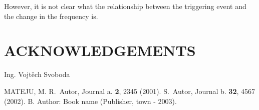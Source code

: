 \documentclass[twoside]{articlek}
\begin{document}
However, it is not clear what the relationship between the triggering event and the change in the frequency is. 
\section{ACKNOWLEDGEMENTS}

Ing. Vojtěch Svoboda %


\begin{thebibliography}{99}

\leftskip=-5pt \vspace{-0.3truecm}
 MATEJU, M.
 R.~Autor, Journal a. {\bf 2}, 2345 (2001).
 S.~Autor, Journal b. {\bf 32}, 4567 (2002).
 B. Author: Book name (Publisher, town - 2003).
\end{thebibliography}
\end{document}
